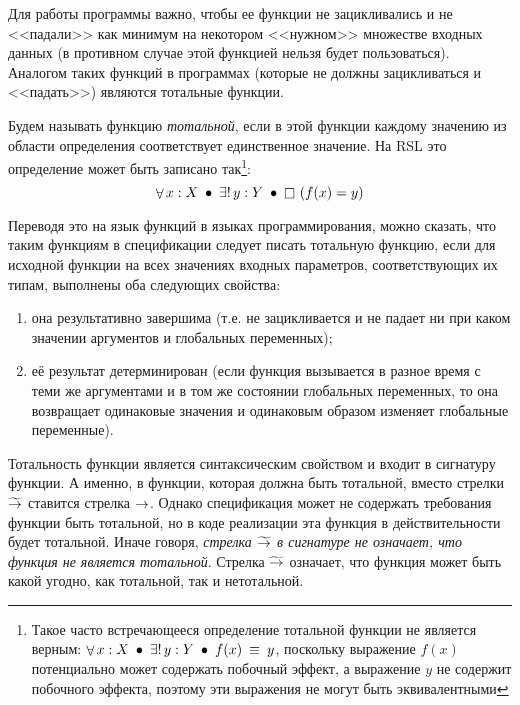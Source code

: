 Для работы программы важно, чтобы ее функции не зацикливались и не <<падали>> как минимум на некотором <<нужном>> множестве входных данных (в противном случае этой функцией нельзя будет пользоваться). Аналогом таких функций в программах (которые не должны зацикливаться и <<падать>>) являются тотальные функции.

Будем называть функцию \emph{тотальной}, если в этой функции каждому значению из области определения соответствует единственное значение. На RSL это определение может быть записано так\footnote{Такое часто встречающееся определение тотальной функции не является верным: $\mathop{\forall} x:X ~\mathop{\bullet}~ \mathop{\exists!} y:Y ~\mathop{\bullet}~ f(x) ~\mathop{\equiv}~ y$, поскольку выражение $f(x)$ потенциально может содержать побочный эффект, а выражение $y$ не содержит побочного эффекта, поэтому эти выражения не могут быть эквивалентными}:
$$\mathop{\forall} x:X ~\mathop{\bullet}~ \mathop{\exists!} y:Y ~\mathop{\bullet}~ \mathop{\Box}~ (f(x) = y)$$


Переводя это на язык функций в языках программирования, можно сказать, что таким функциям в спецификации следует писать тотальную функцию, если для исходной функции на всех значениях входных параметров, соответствующих их типам, выполнены оба следующих свойства:
\begin{enumerate}
  \item она результативно завершима (т.е. не зацикливается и не падает ни при каком значении аргументов и глобальных переменных);
  \item её результат детерминирован (если функция вызывается в разное время с теми же аргументами и в том же состоянии глобальных переменных, то она возвращает одинаковые значения и одинаковым образом изменяет глобальные переменные).

\end{enumerate}

Тотальность функции является синтаксическим свойством и входит в сигнатуру функции. А именно, в функции, которая должна быть тотальной, вместо стрелки $\widetilde{\rightarrow}$ ставится стрелка $\rightarrow$. Однако спецификация может не содержать требования функции быть тотальной, но в коде реализации эта функция в действительности будет тотальной. Иначе говоря, \textit{стрелка $\widetilde{\rightarrow}$ в сигнатуре не означает, что функция не является тотальной}. Стрелка $\widetilde{\rightarrow}$ означает, что функция может быть какой угодно, как тотальной, так и нетотальной.

